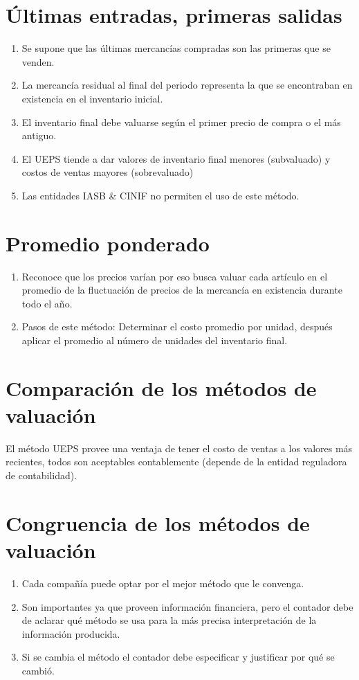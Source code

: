 \documentclass{article}
\begin{document}
\section{Últimas entradas, primeras salidas}
\begin{enumerate}
    \item Se supone que las últimas mercancías compradas son las primeras que se venden.
    \item La mercancía residual al final del periodo representa la que se encontraban en existencia en el inventario inicial.
    \item El inventario final debe valuarse según el primer precio de compra o el más antiguo.
    \item El UEPS tiende a dar valores de inventario final menores (subvaluado) y costos de ventas mayores (sobrevaluado)
    \item Las entidades IASB \& CINIF no permiten el uso de este método. 
\end{enumerate}


\section{Promedio ponderado}
\begin{enumerate}
    \item Reconoce que los precios varían por eso busca valuar cada artículo en el promedio de la fluctuación de precios de la mercancía en existencia durante todo el año.
    \item Pasos de este método: Determinar el costo promedio por unidad, después aplicar el promedio al número de unidades del inventario final.
\end{enumerate}

\section{Comparación de los métodos de valuación}
El método UEPS provee una ventaja de tener el costo de ventas a los valores más recientes, todos son aceptables contablemente (depende de la entidad reguladora de contabilidad).

\section{Congruencia de los métodos de valuación}
\begin{enumerate}
    \item Cada compañía puede optar por el mejor método que le convenga.
    \item Son importantes ya que proveen información financiera, pero el contador debe de aclarar qué método se usa para la más precisa interpretación de la información producida.
    \item Si se cambia el método el contador debe especificar y justificar por qué se cambió. 
\end{enumerate}
\end{document}
